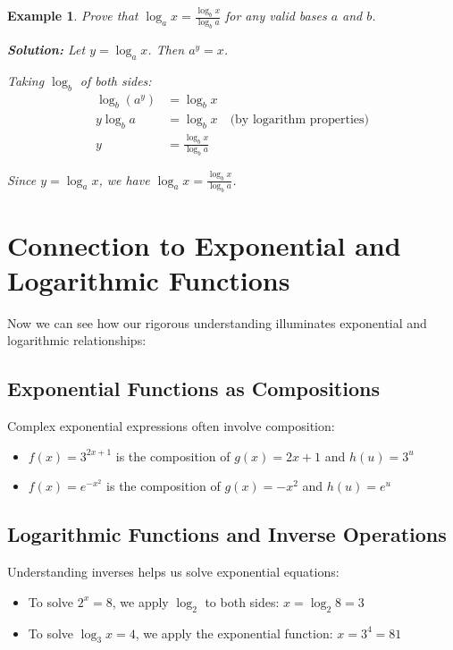 \documentclass[12pt]{article}
\newtheorem{example}{Example}
\begin{document}
\begin{example}
Prove that $\log_a x = \frac{\log_b x}{\log_b a}$ for any valid bases $a$ and $b$.

\textbf{Solution:} Let $y = \log_a x$. Then $a^y = x$.

Taking $\log_b$ of both sides:
\begin{align}
\log_b(a^y) &= \log_b x \\
y \log_b a &= \log_b x \quad \text{(by logarithm properties)} \\
y &= \frac{\log_b x}{\log_b a}
\end{align}

Since $y = \log_a x$, we have $\log_a x = \frac{\log_b x}{\log_b a}$.
\end{example}

\section{Connection to Exponential and Logarithmic Functions}

Now we can see how our rigorous understanding illuminates exponential and logarithmic relationships:

\subsection{Exponential Functions as Compositions}

Complex exponential expressions often involve composition:
\begin{itemize}
\item $f(x) = 3^{2x+1}$ is the composition of $g(x) = 2x + 1$ and $h(u) = 3^u$
\item $f(x) = e^{-x^2}$ is the composition of $g(x) = -x^2$ and $h(u) = e^u$
\end{itemize}

\subsection{Logarithmic Functions and Inverse Operations}

Understanding inverses helps us solve exponential equations:
\begin{itemize}
\item To solve $2^x = 8$, we apply $\log_2$ to both sides: $x = \log_2 8 = 3$
\item To solve $\log_3 x = 4$, we apply the exponential function: $x = 3^4 = 81$
\end{itemize}
\end{document}
